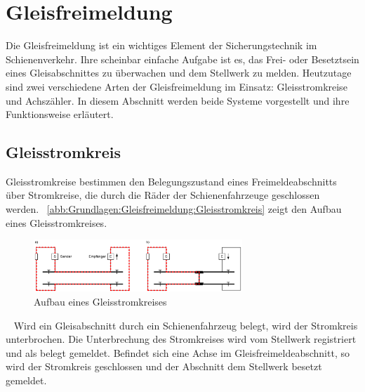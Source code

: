 \section{Gleisfreimeldung}\label{text:Grundlagen:Gleisfreimeldung}

Die Gleisfreimeldung ist ein wichtiges Element der Sicherungstechnik im Schienenverkehr. Ihre scheinbar einfache Aufgabe ist es, das Frei- oder Besetztsein eines Gleisabschnittes zu überwachen und dem Stellwerk zu melden. Heutzutage sind zwei verschiedene Arten der Gleisfreimeldung im Einsatz: Gleisstromkreise und Achszähler. In diesem Abschnitt werden beide Systeme vorgestellt und ihre Funktionsweise erläutert.

\subsection{Gleisstromkreis}\label{text:Grundlagen:Gleisfreimeldung:Gleisstromkreis}

Gleisstromkreise bestimmen den Belegungszustand eines Freimeldeabschnitts über Stromkreise, die durch die Räder der Schienenfahrzeuge geschlossen werden.~\cite[][S. 47]{bib:Sicherung-des-Schienenverkehrs} \autoref{abb:Grundlagen:Gleisfreimeldung:Gleisstromkreis} zeigt den Aufbau eines Gleisstromkreises.

\begin{figure}[H]
    \centering
    \includegraphics[width=0.7\textwidth]{Assets/Images/2-Grundlagen/Gleisstromkreis.png}
    \caption{Aufbau eines Gleisstromkreises~\cite[][S. 47]{bib:Sicherung-des-Schienenverkehrs}}\label{abb:Grundlagen:Gleisfreimeldung:Gleisstromkreis}
\end{figure}

~\cite[][S. 47]{bib:Sicherung-des-Schienenverkehrs} Wird ein Gleisabschnitt durch ein Schienenfahrzeug belegt, wird der Stromkreis unterbrochen. Die Unterbrechung des Stromkreises wird vom Stellwerk registriert und als belegt gemeldet. Befindet sich eine Achse im Gleisfreimeldeabschnitt, so wird der Stromkreis geschlossen und der Abschnitt dem Stellwerk besetzt gemeldet.~\cite[][S. 47]{bib:Sicherung-des-Schienenverkehrs}

